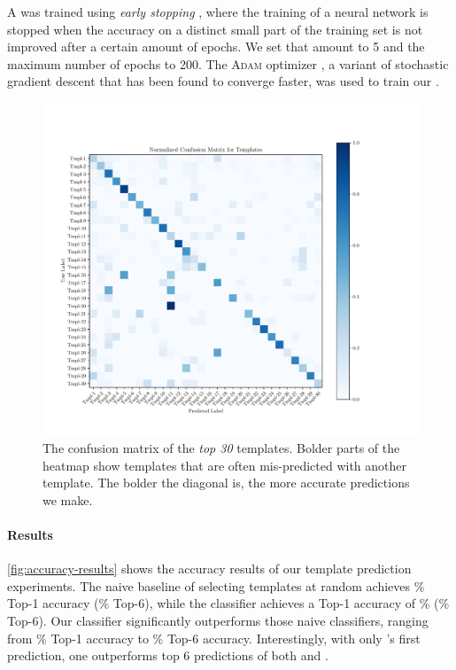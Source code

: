 A \dnn was trained using \emph{early stopping} \cite{Hastie2009-bn}, where the
training of a neural network is stopped when the accuracy on a distinct small
part of the training set is not improved after a certain amount of epochs. We
set that amount to 5 and the maximum number of epochs to 200. The \textsc{Adam}
optimizer \citep{Kingma2014-ng}, a variant of stochastic gradient descent that
has been found to converge faster, was used to train our \dnn.



\begin{figure}[t]
  \centering
  \includegraphics[trim={30 40 100 70},clip,width=\linewidth]{evaluation-conf-matrix.pdf}
  \caption{The confusion matrix of the \emph{top 30} templates. Bolder parts of
  the heatmap show templates that are often mis-predicted with another template.
  The bolder the diagonal is, the more accurate predictions we make.}
  \label{fig:conf-matrix}
\end{figure}

\paragraph{Results}
\autoref{fig:accuracy-results} shows the accuracy results of our template
prediction experiments. The naive baseline of selecting templates at random
achieves \RandomTopOne\% Top-1 accuracy (\RandomTopSix\% Top-6), while the
\popular classifier achieves a Top-1 accuracy of \PopularTopOne\%
(\PopularTopSix\% Top-6). Our \dnn classifier significantly outperforms those
naive classifiers, ranging from \DnnTopOne\% Top-1 accuracy to \DnnTopSix\%
Top-6 accuracy. Interestingly, with only \dnn's first prediction, one
outperforms top 6 predictions of both \random and \popular.

